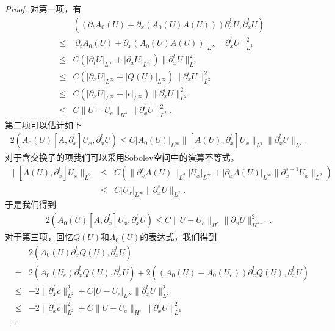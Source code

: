\begin{proof}
对第一项，有
\begin{eqnarray}\label{HsEST:1}
  && ((\partial_t A_0(U) + \partial_x (A_0(U)A(U)))\partial^l_x U, \partial^l_x U) \nonumber\\
  &\le&|\partial_t A_0(U) + \partial_x (A_0(U)A(U))|_{L^\infty}\|\partial^l_x U\|_{L^2}^2 \nonumber\\
  &\le& C (|\partial_t U|_{L^\infty}+|\partial_x U|_{L^{\infty}})\|\partial^l_x U\|_{L^2}^2  \\
  &\le& C (|\partial_x U|_{L^\infty}+|Q(U)|_{L^\infty})\|\partial^l_x U\|_{L^2}^2\nonumber\\
  &\le& C (|\partial_x U|_{L^\infty} + |c|_{L^\infty}) \|\partial^l_x U\|_{L^2}^2\nonumber \\
  &\le& C \|U-U_e\|_{H^s} \|\partial^l_x U\|_{L^2}^2. \nonumber
\end{eqnarray}
第二项可以估计如下
\begin{eqnarray*}
  2(A_0(U) [A,\partial^l_x] U_x, \partial^l_x U) \le C |A_0(U)|_{L^\infty} \|[A(U),\partial^l_x] U_x\|_{L^2} \|\partial^l_x U\|_{L^2}.
\end{eqnarray*}
对于含交换子的项我们可以采用Sobolev空间中的演算不等式\cite{majda1984compressible}。
\begin{eqnarray*}
  \|[A(U),\partial^l_x] U_x\|_{L^2} &\le& C (\|\partial_x^s A(U)\|_{L^2}|U_x|_{L^\infty} + |\partial_x A(U)|_{L^{\infty}} \|\partial_x^{s-1} U_x\|_{L^2})  \\
  &\le& C|U_x|_{L^\infty} \|\partial_x^s U\|_{L^2}.
\end{eqnarray*}
于是我们得到
\begin{eqnarray}\label{HsEST:2}
  2(A_0(U) [A,\partial_x^l] U_x,\partial^l_x U) \le C \|U-U_e\|_{H^s}\|\partial_x U\|_{H^{s-1}}^2.
\end{eqnarray}
对于第三项，回忆$Q(U)$和$A_0(U)$的表达式，我们得到
\begin{eqnarray}\label{HsEST:3}
&& 2(A_0(U)\partial^l_x Q(U),\partial^l_x U) \nonumber \\
&=& 2( A_0(U_e)\partial^l_x Q(U),\partial^l_x U) + 2((A_0(U)-A_0(U_e)) \partial^l_x Q(U),\partial^l_x U) \nonumber \\
&\le&  -2 \|\partial^l_x c\|_{L^2}^2 + C|U-U_e|_{L^\infty} \|\partial^l_x U\|_{L^2}^2 \nonumber \\
&\le& -2 \|\partial^l_x c\|_{L^2}^2 + C\|U-U_e\|_{H^s} \|\partial^l_x U\|_{L^2}^2
\end{eqnarray}


\end{proof}
